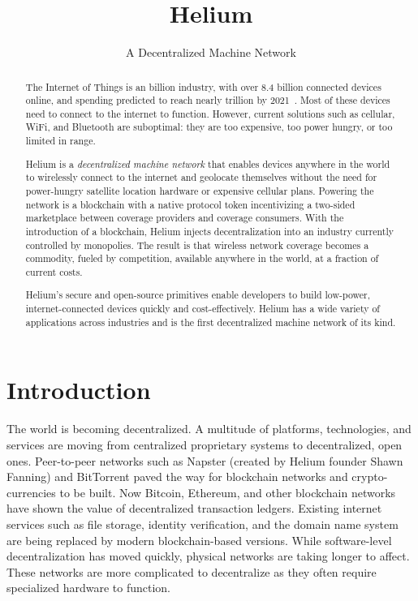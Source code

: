 \documentclass[10pt, nonatbib, nocopyrightspace, reprint]{sigplanconf}
\begin{document}
\setlength{\pdfpageheight}{\paperheight}
\setlength{\pdfpagewidth}{\paperwidth}

\title{Helium}
\subtitle{A Decentralized Machine Network}

\maketitle

\begin{abstract}
The Internet of Things is an  billion industry, with over 8.4 billion connected devices online, and spending predicted to reach nearly  trillion by 2021~\cite{idc}. Most of these devices need to connect to the internet to function. However, current solutions such as cellular, WiFi, and Bluetooth are suboptimal: they are too expensive, too power hungry, or too limited in range.

Helium is a \emph{decentralized machine network} that enables devices anywhere in the world to wirelessly connect to the internet and geolocate themselves without the need for power-hungry satellite location hardware or expensive cellular plans. Powering the network is a blockchain with a native protocol token incentivizing a two-sided marketplace between coverage providers and coverage consumers. With the introduction of a blockchain, Helium injects decentralization into an industry currently controlled by monopolies. The result is that wireless network coverage becomes a commodity, fueled by competition, available anywhere in the world, at a fraction of current costs.

Helium's secure and open-source primitives enable developers to build low-power, internet-connected devices quickly and cost-effectively. Helium has a wide variety of applications across industries and is the first decentralized machine network of its kind.
\end{abstract}

\section{Introduction}

The world is becoming decentralized. A multitude of platforms, technologies, and services are moving from centralized proprietary systems to decentralized, open ones. Peer-to-peer networks such as Napster (created by Helium founder Shawn Fanning) \cite{napster} and BitTorrent paved the way for blockchain networks and crypto-currencies to be built. Now Bitcoin, Ethereum, and other blockchain networks have shown the value of decentralized transaction ledgers. Existing internet services such as file storage, identity verification, and the domain name system are being replaced by modern blockchain-based versions. While software-level decentralization has moved quickly, physical networks are taking longer to affect. These networks are more complicated to decentralize as they often require specialized hardware to function.
\end{document}
